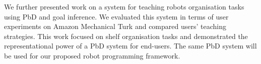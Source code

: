 We further presented work on a system for teaching robots organisation tasks using PbD and goal inference. 
We evaluated this system in terms of user experiments on Amazon Mechanical Turk and compared users' teaching strategies.
This work focused on shelf organisation tasks and demonstrated the representational power of a PbD system for end-users. 
The same PbD system will be used for our proposed robot programming framework.

